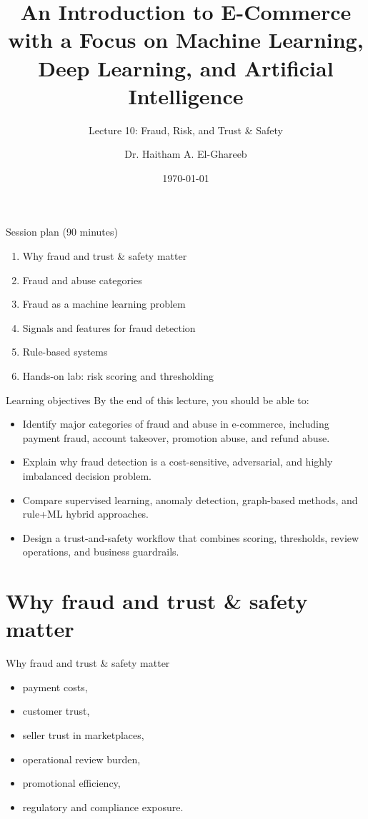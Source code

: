 \documentclass[aspectratio=169]{beamer}
\title[Lecture 10]{An Introduction to E-Commerce\\\small with a Focus on Machine Learning, Deep Learning, and Artificial Intelligence}
\subtitle{Lecture 10: Fraud, Risk, and Trust \& Safety}
\author{Dr. Haitham A. El-Ghareeb}
\institute{Faculty of Computers and Information Sciences \\ Mansoura University \\ Egypt}
\date{\today}
\begin{document}
\begin{frame}
  \titlepage
\end{frame}

\begin{frame}{Session plan (90 minutes)}
  \begin{enumerate}
    \item Why fraud and trust \& safety matter
    \item Fraud and abuse categories
    \item Fraud as a machine learning problem
    \item Signals and features for fraud detection
    \item Rule-based systems
    \item Hands-on lab: risk scoring and thresholding
  \end{enumerate}
\end{frame}

\begin{frame}{Learning objectives}
  By the end of this lecture, you should be able to:
  \begin{itemize}
    \item Identify major categories of fraud and abuse in e-commerce, including payment fraud, account takeover, promotion abuse, and refund abuse.
    \item Explain why fraud detection is a cost-sensitive, adversarial, and highly imbalanced decision problem.
    \item Compare supervised learning, anomaly detection, graph-based methods, and rule+ML hybrid approaches.
    \item Design a trust-and-safety workflow that combines scoring, thresholds, review operations, and business guardrails.
  \end{itemize}
\end{frame}

\section{Why fraud and trust \& safety matter}

\begin{frame}{Why fraud and trust \& safety matter}
  \begin{itemize}
    \item payment costs,
    \item customer trust,
    \item seller trust in marketplaces,
    \item operational review burden,
    \item promotional efficiency,
    \item regulatory and compliance exposure.
  \end{itemize}
\end{frame}
\end{document}

